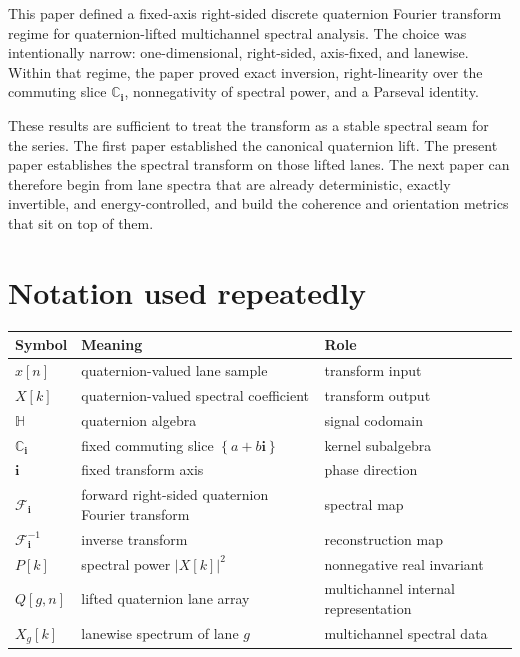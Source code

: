 \documentclass[11pt]{article}
\theoremstyle{remark}
\newcommand{\C}{\mathbb{C}}
\newcommand{\HH}{\mathbb{H}}
\newcommand{\Ci}{\C_{\mathbf{i}}}
\newcommand{\ii}{\mathbf{i}}
\newcommand{\F}{\mathcal{F}_{\ii}}
\newcommand{\Finv}{\mathcal{F}_{\ii}^{-1}}
\newcommand{\abs}[1]{\left\lvert #1 \right\rvert}
\newcommand{\set}[1]{\left\{ #1 \right\}}
\begin{document}
This paper defined a fixed-axis right-sided discrete quaternion Fourier transform regime for quaternion-lifted multichannel spectral analysis. The choice was intentionally narrow: one-dimensional, right-sided, axis-fixed, and lanewise. Within that regime, the paper proved exact inversion, right-linearity over the commuting slice \(\Ci\), nonnegativity of spectral power, and a Parseval identity.

These results are sufficient to treat the transform as a stable spectral seam for the series. The first paper established the canonical quaternion lift. The present paper establishes the spectral transform on those lifted lanes. The next paper can therefore begin from lane spectra that are already deterministic, exactly invertible, and energy-controlled, and build the coherence and orientation metrics that sit on top of them.

\appendix

\section{Notation used repeatedly}

\begin{center}
\begin{tabular}{@{}lll@{}}
\toprule
Symbol & Meaning & Role \\
\midrule
\(x[n]\) & quaternion-valued lane sample & transform input \\
\(X[k]\) & quaternion-valued spectral coefficient & transform output \\
\(\HH\) & quaternion algebra & signal codomain \\
\(\Ci\) & fixed commuting slice \(\set{a+b\ii}\) & kernel subalgebra \\
\(\ii\) & fixed transform axis & phase direction \\
\(\F\) & forward right-sided quaternion Fourier transform & spectral map \\
\(\Finv\) & inverse transform & reconstruction map \\
\(P[k]\) & spectral power \(\abs{X[k]}^2\) & nonnegative real invariant \\
\(Q[g,n]\) & lifted quaternion lane array & multichannel internal representation \\
\(X_g[k]\) & lanewise spectrum of lane \(g\) & multichannel spectral data \\
\bottomrule
\end{tabular}
\end{center}
\end{document}
